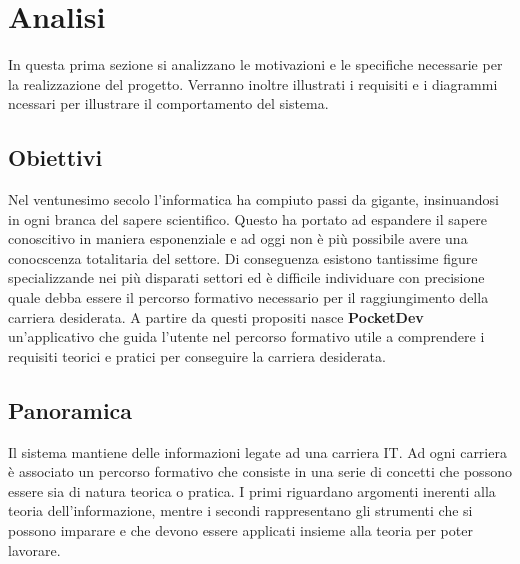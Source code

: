 \section{Analisi}
In questa prima sezione si analizzano le motivazioni e le specifiche necessarie per la realizzazione del progetto. Verranno inoltre illustrati i requisiti e i diagrammi ncessari per illustrare il comportamento del sistema.
\subsection{Obiettivi}
Nel ventunesimo secolo l'informatica ha compiuto passi da gigante, insinuandosi in ogni branca del sapere scientifico. Questo ha portato ad espandere il sapere conoscitivo in maniera esponenziale e ad oggi non è più possibile avere una conocscenza totalitaria del settore. Di conseguenza esistono tantissime figure specializzande nei più disparati settori ed è difficile individuare con precisione quale debba essere il percorso formativo necessario per il raggiungimento della carriera desiderata. A partire da questi propositi nasce \textbf{PocketDev} un'applicativo che guida l'utente nel percorso formativo utile a comprendere i requisiti teorici e pratici per conseguire la carriera desiderata.
\subsection{Panoramica}
Il sistema mantiene delle informazioni legate ad una carriera IT. Ad ogni carriera è associato un percorso formativo che consiste in una serie di concetti che possono essere sia di natura teorica o pratica. I primi riguardano argomenti inerenti alla teoria dell'informazione, mentre i secondi rappresentano gli strumenti che si possono imparare e che devono essere applicati insieme alla teoria per poter lavorare.
